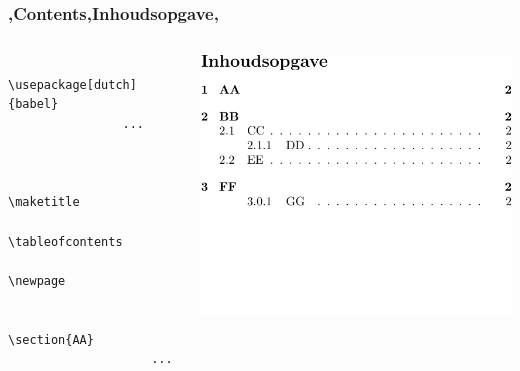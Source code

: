 \fi


\def\highlightlines{}
\unless\ifishandout
\def\highlightlines{1}
\fi

\begin{frame}[fragile]
    \frametitle{\lang,Contents,Inhoudsopgave,}
    
    \begin{columns}
        \begin{column}{0.5\textwidth}
            \begin{verbatim}
                \usepackage[dutch]{babel}
                ...
                
                
                    \maketitle
                    \tableofcontents
                    \newpage
                    
                    \section{AA}
                    ...
                
            \end{verbatim}
        \end{column}
        \begin{column}{0.5\textwidth}
            \includegraphics[width=\linewidth,height=0.8\textheight,keepaspectratio,page=1]{assets/tableofcontentsdutch.pdf}
            \vspace{-60pt}
        \end{column}
    \end{columns}
\end{frame}

